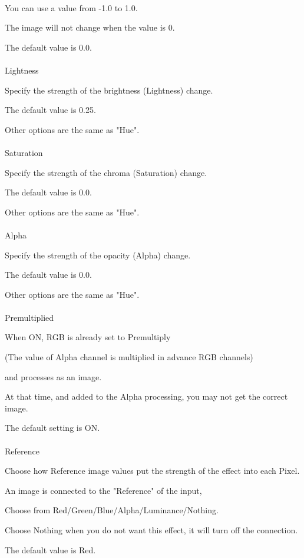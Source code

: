 \documentclass[a4paper,12pt]{article}
\begin{document}
\ \vspace{-0.2em}
\par
You can use a value from -1.0 to 1.0.\par
The image will not change when the value is 0.\par
The default value is 0.0.\\
\\
Lightness\par
Specify the strength of the brightness (Lightness) change.\par
The default value is 0.25.\par
Other options are the same as "Hue".\\
\\
Saturation\par
Specify the strength of the chroma (Saturation) change.\par
The default value is 0.0.\par
Other options are the same as "Hue".\\
\\
Alpha\par
Specify the strength of the opacity (Alpha) change.\par
The default value is 0.0.\par
Other options are the same as "Hue".\\
\\
Premultiplied\par
When ON, RGB is already set to Premultiply\par
(The value of Alpha channel is multiplied in advance RGB channels)\par
and processes as an image.\par
At that time, and added to the Alpha processing, you may not get the correct image.\par
The default setting is ON.\\
\\
Reference\par
Choose how Reference image values put the strength of the effect into each Pixel.\par
An image is connected to the "Reference" of the input,\par
Choose from Red/Green/Blue/Alpha/Luminance/Nothing.\par
Choose Nothing when you do not want this effect, it will turn off the connection.\par
The default value is Red.
\end{document}
